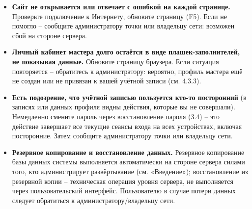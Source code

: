 \begin{itemize}
  \item \textbf{Сайт не открывается или отвечает с ошибкой на каждой
        странице.} Проверьте подключение к Интернету, обновите страницу
        (F5). Если не помогло -- сообщите администратору точки или
        владельцу сети: возможен сбой на стороне сервера.
  \item \textbf{Личный кабинет мастера долго остаётся в виде
        плашек-заполнителей, не показывая данные.} Обновите страницу
        браузера. Если ситуация повторяется -- обратитесь к администратору:
        вероятно, профиль мастера ещё не создан или не привязан к вашей
        учётной записи (см. 4.3.3).
  \item \textbf{Есть подозрение, что учётной записью пользуется кто-то
        посторонний} (в записях или данных профиля видны действия, которые
        вы не совершали). Немедленно смените пароль через восстановление
        пароля (3.4) -- это действие завершает все текущие сеансы входа
        на всех устройствах, включая посторонние. Затем сообщите
        администратору точки или владельцу сети.
  \item \textbf{Резервное копирование и восстановление данных.} Резервное
        копирование базы данных системы выполняется автоматически на
        стороне сервера силами того, кто администрирует развёртывание
        (см. «Введение»); восстановление из резервной копии -- техническая
        операция уровня сервера, не выполняется через пользовательский
        интерфейс. Пользователю в случае потери данных следует обратиться
        к администратору/владельцу сети.
\end{itemize}

\clearpage
\appendix



